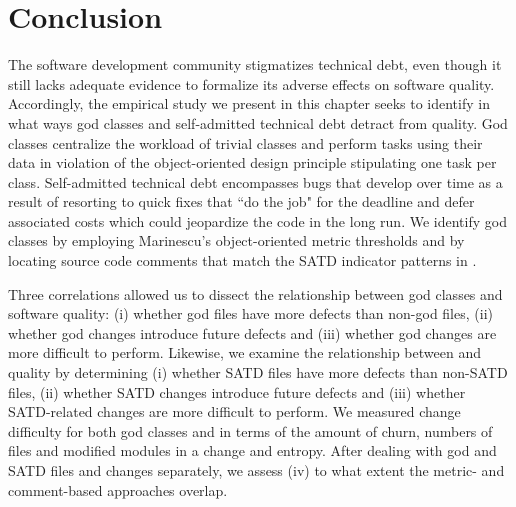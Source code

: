 {%







\section{Conclusion}
\label{chap4:sec:conclusion}


The software development community stigmatizes technical debt, even though it still lacks adequate evidence to formalize its adverse effects on software quality. Accordingly, the empirical study we present in this chapter seeks to identify in what ways god classes and self-admitted technical debt detract from quality. God classes centralize the workload of trivial classes and perform tasks using their data in violation of the object-oriented design principle stipulating one task per class. Self-admitted technical debt encompasses bugs that develop over time as a result of resorting to quick fixes that ``do the job" for the deadline and defer associated costs which could jeopardize the code in the long run. We identify god classes by employing Marinescu's \cite{marinescu2004detection} object-oriented metric thresholds and \SATD by locating source code comments that match the SATD indicator patterns in \cite{ICSM_PotdarS14}.


Three correlations allowed us to dissect the relationship between god classes and software quality: (i) whether god files have more defects than non-god files, (ii) whether god changes introduce future defects and (iii) whether god changes are more difficult to perform. Likewise, we examine the relationship between \SATD and quality by determining (i) whether SATD files have more defects than non-SATD files, (ii) whether SATD changes introduce future defects and (iii) whether SATD-related changes are more difficult to perform. We measured change difficulty for both god classes and \SATD in terms of the amount of churn, numbers of files and modified modules in a change and entropy. After dealing with god and SATD files and changes separately, we assess (iv) to what extent the metric- and comment-based approaches overlap.


}
